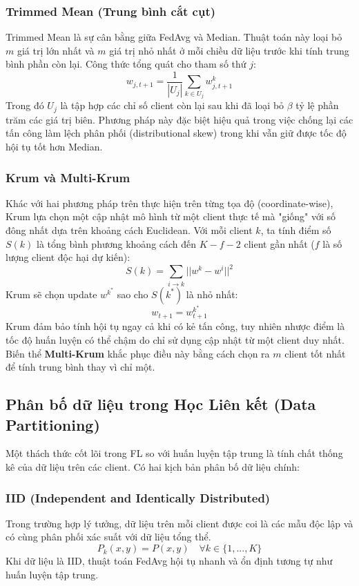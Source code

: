 \subsubsection{Trimmed Mean (Trung bình cắt cụt)}
Trimmed Mean là sự cân bằng giữa FedAvg và Median. Thuật toán này loại bỏ $m$ giá trị lớn nhất và $m$ giá trị nhỏ nhất ở mỗi chiều dữ liệu trước khi tính trung bình phần còn lại.
Công thức tổng quát cho tham số thứ $j$:
$$w_{j, t+1} = \frac{1}{|U_j|} \sum_{k \in U_j} w_{j, t+1}^k$$
Trong đó $U_j$ là tập hợp các chỉ số client còn lại sau khi đã loại bỏ $\beta$ tỷ lệ phần trăm các giá trị biên. Phương pháp này đặc biệt hiệu quả trong việc chống lại các tấn công làm lệch phân phối (distributional skew) trong khi vẫn giữ được tốc độ hội tụ tốt hơn Median.

\subsubsection{Krum và Multi-Krum}
Khác với hai phương pháp trên thực hiện trên từng tọa độ (coordinate-wise), Krum \cite{blanchard2017machine} lựa chọn một cập nhật mô hình từ một client thực tế mà "giống" với số đông nhất dựa trên khoảng cách Euclidean.
Với mỗi client $k$, ta tính điểm số $S(k)$ là tổng bình phương khoảng cách đến $K - f - 2$ client gần nhất ($f$ là số lượng client độc hại dự kiến):
$$S(k) = \sum_{i \rightarrow k} ||w^k - w^i||^2$$
Krum sẽ chọn update $w^{k^*}$ sao cho $S(k^*)$ là nhỏ nhất:
$$w_{t+1} = w_{t+1}^{k^*}$$
Krum đảm bảo tính hội tụ ngay cả khi có kẻ tấn công, tuy nhiên nhược điểm là tốc độ huấn luyện có thể chậm do chỉ sử dụng cập nhật từ một client duy nhất. Biến thể \textbf{Multi-Krum} khắc phục điều này bằng cách chọn ra $m$ client tốt nhất để tính trung bình thay vì chỉ một.

\subsection{Phân bố dữ liệu trong Học Liên kết (Data Partitioning)}

Một thách thức cốt lõi trong FL so với huấn luyện tập trung là tính chất thống kê của dữ liệu trên các client. Có hai kịch bản phân bố dữ liệu chính:

\subsubsection{IID (Independent and Identically Distributed)}
Trong trường hợp lý tưởng, dữ liệu trên mỗi client được coi là các mẫu độc lập và có cùng phân phối xác suất với dữ liệu tổng thể.
$$P_k(x, y) = P(x, y) \quad \forall k \in \{1, ..., K\}$$
Khi dữ liệu là IID, thuật toán FedAvg hội tụ nhanh và ổn định tương tự như huấn luyện tập trung.


